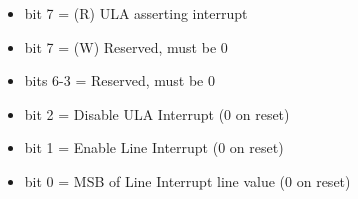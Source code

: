 \begin{itemize}
\item bit 7 = (R) ULA asserting interrupt
\item bit 7 = (W) Reserved, must be 0
\item bits 6-3 = Reserved, must be 0
\item bit 2 = Disable ULA Interrupt (0 on reset)
\item bit 1 = Enable Line Interrupt (0 on reset)
\item bit 0 = MSB of Line Interrupt line value (0 on reset)
\end{itemize}

